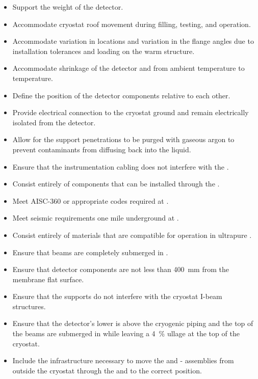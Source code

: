 \begin{itemize}
 \setlength\itemsep{1mm}
\setlength{\parsep}{1mm}
\setlength{\itemsep}{-5mm}
\item Support the weight of the detector.
\item Accommodate cryostat roof movement during filling, testing, and operation.
\item Accommodate variation in \fdth locations and
  variation in the flange angles due to installation tolerances and
  loading on the warm structure.
\item Accommodate shrinkage of the detector and  from ambient
  temperature to  temperature.
\item Define the position of the detector components relative to each other. 
\item Provide electrical connection to the cryostat ground and remain electrically isolated from the detector.
\item Allow for the support penetrations to be purged with gaseous argon to prevent contaminants from diffusing back into the liquid. 
\item Ensure that the instrumentation cabling does not interfere with the .
\item Consist entirely of components that can %
be installed through the .
\item %
Meet AISC-360 or appropriate codes required at \surf.
\item %
Meet seismic requirements one mile underground at \surf.
\item Consist entirely of %
materials that are compatible for operation in ultrapure .
\item Ensure that beams are completely submerged in .
\item Ensure that detector components are not less than \SI{400}{mm} from the membrane flat surface.
\item Ensure that the supports do not interfere with the cryostat I-beam structures.
\item Ensure %
that the detector's lower  is above the cryogenic piping and the top of the  beams are submerged in  while leaving a \SI{4}{\%} ullage at the top of the cryostat.
\item Include the infrastructure necessary to move the  and
  - assemblies from outside the cryostat through the
   and to the correct position.
\end{itemize}

